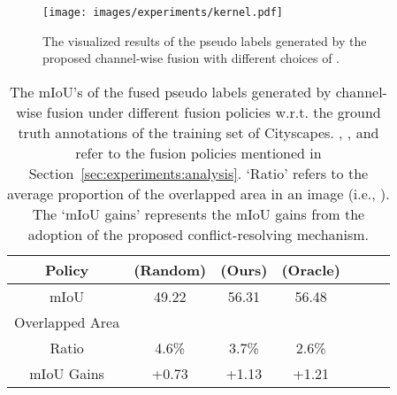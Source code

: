 \documentclass[final]{cvpr}
\begin{document}
\begin{table}[t]

\caption{The mIoU gains of  with  for different .}
\label{tab:kernel}
\end{table}
 \begin{figure}[t]
    \texttt{[image: images/experiments/kernel.pdf]}
    \caption{The visualized results of the pseudo labels generated by the proposed channel-wise fusion with different choices of .} 
    \label{fig:kernel}
\end{figure}
 \begin{table}[t]
\newcommand{\mytoprule}{\toprule[1.08pt]}
\renewcommand{\arraystretch}{1.1}
\centering
\footnotesize
\begin{tabular}{ccccccc}
\mytoprule
Policy &  (Random) &  (Ours) &  (Oracle) \\ \hline 
mIoU & 49.22 & 56.31 & 56.48\\ \hline \hline
Overlapped Area &  & & \\ \hline
Ratio & 4.6\% & 3.7\% & 2.6\% \\
mIoU Gains & +0.73 & +1.13 & +1.21 \\\mytoprule
\end{tabular}\caption{The mIoU's of the fused pseudo labels generated by channel-wise fusion  under different fusion policies w.r.t. the ground truth annotations of the training set of Cityscapes. , , and  refer to the fusion policies mentioned in Section~\ref{sec:experiments:analysis}. `Ratio' refers to the average proportion of the overlapped area in an image (i.e., ). The `mIoU gains' represents the mIoU gains from the adoption of the proposed conflict-resolving mechanism.}
\label{tab:policy}
\end{table}
\end{document}

